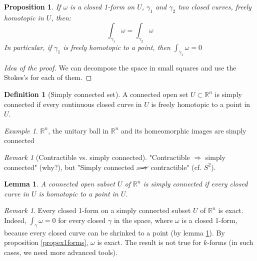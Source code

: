 \documentclass[a4paper,11pt,titlepage, article, oneside]{memoir}
\numberwithin{equation}{section}
\newtheorem{proposition}[theorem]{Proposition}
\newtheorem{lemma}[theorem]{Lemma}
\theoremstyle{definition}
\newtheorem{definition}[theorem]{Definition}
\theoremstyle{remark}
\newtheorem{remark}[theorem]{Remark}
\newtheorem{example}[theorem]{Example}
\newcommand{\rfield}{\mathbb{R}}
\begin{document}
\begin{proposition}
  If $\omega$ is a closed 1-form on $U$, $\gamma_1$ and $\gamma_2$ two closed curves, freely homotopic in $U$, then:
  \begin{equation}
    \int_{\gamma_1} \omega = \int_{\gamma_2} \omega
  \end{equation}
  In particular, if $\gamma_1$ is freely homotopic to a point, then $\int_{\gamma_1} \omega = 0$
\end{proposition}
\begin{proof}[Idea of the proof]
We can decompose the space in small squares and use the Stokes's for each of them.
\end{proof}

\begin{definition}[Simply connected set]
  A connected open set $U \subset \rfield^n$ is simply connected if every continuous closed curve in $U$ is freely homotopic to a point in $U$.
\end{definition}

\begin{tcolorbox}\begin{example}
  $\rfield^n$, the unitary ball in $\rfield^n$ and its homeomorphic images are simply connected
\end{example}\end{tcolorbox}

\begin{remarkbox}\begin{remark}[Contractible vs. simply connected]
"Contractible $\Longrightarrow$ simply connected" (why?), but "Simply connected $\cancel{\Longrightarrow}$ contractible" (cf. $S^2$).
\end{remark}\end{remarkbox}

\begin{lemma} \label{closedinsimplyconn}
  A connected open subset $U$ of $\rfield^n$ is simply connected if every closed curve in $U$ is homotopic to a point in $U$.
\end{lemma}

\begin{remarkbox}\begin{remark}
  Every closed 1-form on a simply connected subset $U$ of $\rfield^n$ is exact. Indeed, $\int_{\gamma} \omega = 0$ for every closed $\gamma$ in the space, where $\omega$ is a closed 1-form, because every closed curve can be shrinked to a point (by lemma \ref{closedinsimplyconn}). By proposition \ref{propex1forms}, $\omega$ is exact. The result is not true for $k$-forms (in such cases, we need more advanced tools).
\end{remark}\end{remarkbox}
\end{document}
